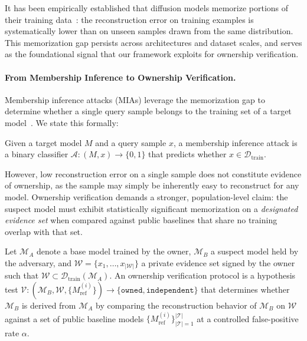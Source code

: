 \documentclass[sigconf, review, anonymous]{acmart}
\begin{document}
It has been empirically established that diffusion models memorize
portions of their training data~\cite{carlini2023extracting,
somepalli2023diffusion}: the reconstruction error on training
examples is systematically lower than on unseen samples drawn from
the same distribution. This memorization gap persists across
architectures and dataset scales, and serves as the foundational
signal that our framework exploits for ownership verification.

\paragraph{From Membership Inference to Ownership Verification.}
Membership inference attacks (MIAs) leverage the memorization gap
to determine whether a single query sample belongs to the training
set of a target model~\cite{duan2023diffusion, kong2024efficient}.
We state this formally:

\begin{definition}
Given a target model $M$ and a query sample $x$, a
membership inference attack is a binary classifier
$\mathcal{A}: (M, x) \rightarrow \{0, 1\}$ that predicts
whether $x \in \mathcal{D}_{\mathrm{train}}$.
\end{definition}

However, low reconstruction error on a single sample does not constitute evidence of ownership, as the sample may simply be inherently easy to reconstruct for any model. Ownership
verification demands a stronger, population-level claim: the
suspect model must exhibit statistically significant memorization
on a \emph{designated evidence set} when compared against public
baselines that share no training overlap with that set.

\begin{definition}
Let $\mathcal{M}_A$ denote a base model trained by the
owner, $\mathcal{M}_B$ a suspect model held by the
adversary, and $\mathcal{W} = \{x_1, \dots, x_{|\mathcal{W}|}\}$ a private
evidence set signed by the owner such that
$\mathcal{W} \subset \mathcal{D}_{\mathrm{train}}
(\mathcal{M}_A)$. An ownership verification protocol is
a hypothesis test
$\mathcal{V}: (\mathcal{M}_B, \mathcal{W},
\{M_{\text{ref}}^{(i)}\}) \rightarrow
\{\texttt{owned}, \texttt{independent}\}$
that determines whether $\mathcal{M}_B$ is derived from
$\mathcal{M}_A$ by comparing the reconstruction behavior
of $\mathcal{M}_B$ on $\mathcal{W}$ against a set of
public baseline models
$\{M_{\text{ref}}^{(i)}\}_{|\mathcal{T}|=1}^{|\mathcal{T}|}$ at a controlled
false-positive rate $\alpha$.
\end{definition}
\end{document}
